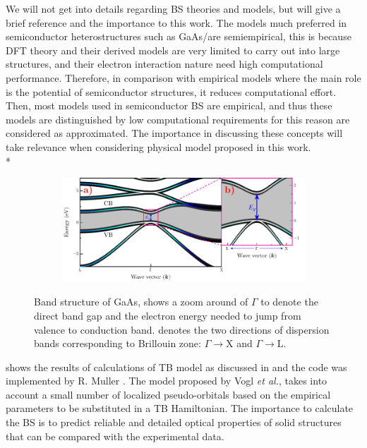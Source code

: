 We will not get into details regarding BS theories and models, but will give a brief reference and the importance to this work. The models much preferred in semiconductor heterostructures such as GaAs/\algaas are semiempirical, this is because
\gls{DFT} theory and their derived models are very limited to carry out into large structures, and
their electron interaction nature need high computational performance. Therefore, in comparison
with empirical models where the main role is the potential of semiconductor structures, it reduces computational effort.
Then, most models used in semiconductor BS are empirical, and thus these models are distinguished by low computational requirements for this reason are considered as approximated. The importance in discussing these concepts will take relevance when considering physical model proposed in this work. \\*
\begin{figure}[h!]\label{fig:subsubsection-1.1.1-GaAsbands-1}
	\centering
	\begin{subfigure}{\textwidth}
	\includegraphics[width=\linewidth]{../figures/chapter-1/bands/build/bands01}
	\label{subfig:subsubsection-1.1.1-GaAsbands-1-a)}
	\label{subfig:subsubsection-1.1.1-GaAsbands-1-b)}
\end{subfigure}
	\caption{Band structure of GaAs,  shows a zoom around of $\Gamma$  to denote the direct band gap and the electron energy  needed to jump from valence to conduction band.  denotes the two directions of dispersion bands corresponding to Brillouin zone: $\Gamma\to\mathrm{X}$ and  $\Gamma\to\mathrm{L}$.\cite{fox2002optical}}
\end{figure}
 shows the results of calculations of \gls{TB} model as discussed in \cite{vogl1983asemiempirical} and the code was implemented by R. Muller \cite{rpmuller2017}. The model proposed by Vogl \textit{et al.},  takes into account a small number of localized pseudo-orbitals  based on the empirical parameters to be  substituted in a TB Hamiltonian.  The importance to calculate the BS is to  predict  reliable and detailed optical properties of solid structures that can be compared with the experimental data.

